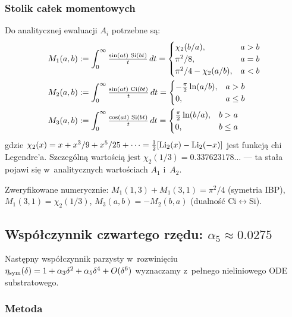 \subsubsection*{Stolik ca\l{}ek momentowych}

Do analitycznej ewaluacji $A_i$ potrzebne s\k{a}:
\begin{align}
  M_1(a,b) &:= \int_0^\infty \tfrac{\sin(a t)\, \operatorname{Si}(b t)}{t}\, dt
            = \begin{cases} \chi_2(b/a), & a > b \\ \pi^2/8, & a = b \\ \pi^2/4 - \chi_2(a/b), & a < b \end{cases} \\
  M_2(a,b) &:= \int_0^\infty \tfrac{\sin(a t)\, \operatorname{Ci}(b t)}{t}\, dt
            = \begin{cases} -\tfrac{\pi}{2} \ln(a/b), & a > b \\ 0, & a \le b \end{cases} \\
  M_3(a,b) &:= \int_0^\infty \tfrac{\cos(a t)\, \operatorname{Si}(b t)}{t}\, dt
            = \begin{cases} \tfrac{\pi}{2} \ln(b/a), & b > a \\ 0, & b \le a \end{cases}
\end{align}
gdzie $\chi_2(x) = x + x^3/9 + x^5/25 + \cdots = \tfrac{1}{2}[\operatorname{Li}_2(x) - \operatorname{Li}_2(-x)]$
jest funkcj\k{a} chi Legendre'a. Szczeg\'oln\k{a} warto\'sci\k{a} jest
$\chi_2(1/3) = 0.337623178\ldots$ --- ta sta\l{}a pojawi si\k{e} w~analitycznych
warto\'sciach $A_1$ i~$A_2$.

Zweryfikowane numerycznie: $M_1(1,3) + M_1(3,1) = \pi^2/4$ (symetria IBP),
$M_1(3,1) = \chi_2(1/3)$, $M_3(a,b) = -M_2(b,a)$ (dualno\'s\'c Ci$\leftrightarrow$Si).

\subsection{Wsp\'o\l{}czynnik czwartego rz\k{e}du: $\alpha_5 \approx 0.0275$}
\label{sec:T6-alpha5}

Nast\k{e}pny wsp\'o\l{}czynnik parzysty w~rozwini\k{e}ciu
$\eta_{\rm sym}(\delta) = 1 + \alpha_3 \delta^2 + \alpha_5 \delta^4 + O(\delta^6)$
wyznaczamy z~pe\l{}nego nieliniowego ODE substratowego.

\subsubsection*{Metoda}

